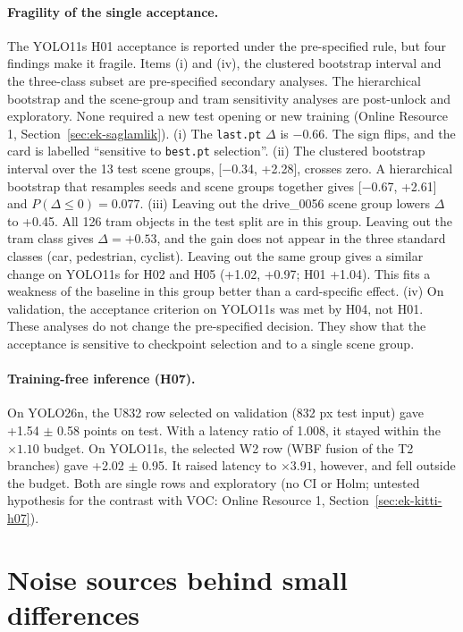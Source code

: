 \documentclass[pdflatex,iicol,sn-mathphys-num]{sn-jnl}
\begin{document}
\paragraph{Fragility of the single acceptance.}
The YOLO11s H01 acceptance is reported under the pre-specified rule, but four findings make it fragile. Items (i) and (iv), the clustered bootstrap interval and the three-class subset are pre-specified secondary analyses. The hierarchical bootstrap and the scene-group and tram sensitivity analyses are post-unlock and exploratory. None required a new test opening or new training (Online Resource 1, Section~\ref{sec:ek-saglamlik}). (i) The \texttt{last.pt} $\Delta$ is $-$0.66. The sign flips, and the card is labelled ``sensitive to \texttt{best.pt} selection''. (ii) The clustered bootstrap interval over the 13 test scene groups, [$-$0.34, +2.28], crosses zero. A hierarchical bootstrap that resamples seeds and scene groups together gives [$-$0.67, +2.61] and $P(\Delta\le0)=0.077$. (iii) Leaving out the drive\_0056 scene group lowers $\Delta$ to +0.45. All 126 tram objects in the test split are in this group. Leaving out the tram class gives $\Delta=+0.53$, and the gain does not appear in the three standard classes (car, pedestrian, cyclist). Leaving out the same group gives a similar change on YOLO11s for H02 and H05 (+1.02, +0.97; H01 +1.04). This fits a weakness of the baseline in this group better than a card-specific effect. (iv) On validation, the acceptance criterion on YOLO11s was met by H04, not H01. These analyses do not change the pre-specified decision. They show that the acceptance is sensitive to checkpoint selection and to a single scene group.

\paragraph{Training-free inference (H07).}
On YOLO26n, the U832 row selected on validation (832 px test input) gave +1.54 $\pm$ 0.58 points on test. With a latency ratio of 1.008, it stayed within the $\times1.10$ budget. On YOLO11s, the selected W2 row (WBF fusion of the T2 branches) gave +2.02 $\pm$ 0.95. It raised latency to $\times3.91$, however, and fell outside the budget. Both are single rows and exploratory (no CI or Holm; untested hypothesis for the contrast with VOC: Online Resource 1, Section~\ref{sec:ek-kitti-h07}).

\section{Noise sources behind small differences}\label{sec:gurultu}\label{sec:tartisma}
\end{document}
